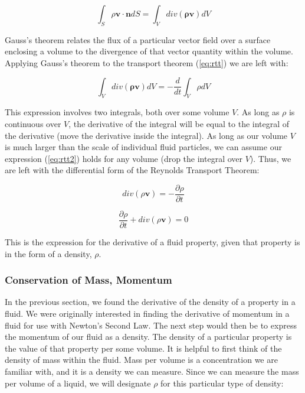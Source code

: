 \documentclass[twocolumn,12pth]{article}
\begin{document}
\begin{equation}
\int_S \rho \mathbf{v} \cdot \mathbf{n} dS = \int_V div(\mathbf{\rho{v}}) dV
\end{equation}

Gauss's theorem relates the flux of a particular vector field over a surface enclosing a volume to the divergence of that vector quantity within the volume.
Applying Gauss's theorem to the transport theorem (\ref{eq:rtt}) we are left with:

\begin{equation}
\int_V div(\mathbf{\rho{v}}) dV = - \frac{d}{dt} \int_{V} \rho dV
\label{eq:rtt2}
\end{equation}

This expression involves two integrals, both over some volume $V$.
As long as $\rho$ is continuous over $V$, the derivative of the integral will be equal to the integral of the derivative (move the derivative inside the integral).
As long as our volume $V$ is much larger than the scale of individual fluid particles, we can assume our expression (\ref{eq:rtt2}) holds for any volume (drop the integral over $V$).
Thus, we are left with the differential form of the Reynolds Transport Theorem:

\begin{equation*}
div(\rho \mathbf{v}) = -\frac{\partial{\rho}}{\partial{t}}
\end{equation*}

\begin{equation}
\frac{\partial{\rho}}{\partial{t}} + div(\rho \mathbf{v}) = 0
\label{eq:der}
\end{equation}

This is the expression for the derivative of a fluid property, given that property is in the form of a density, $\rho$.


\subsubsection{Conservation of Mass, Momentum}

In the previous section, we found the derivative of the density of a property in a fluid.
We were originally interested in finding the derivative of momentum in a fluid for use with Newton's Second Law.
The next step would then be to express the momentum of our fluid as a density.
The density of a particular property is the value of that property per some volume.
It is helpful to first think of the density of mass within the fluid.
Mass per volume is a concentration we are familiar with, and it is a density we can measure.
Since we can measure the mass per volume of a liquid, we will designate $\rho$ for this particular type of density:
\end{document}

